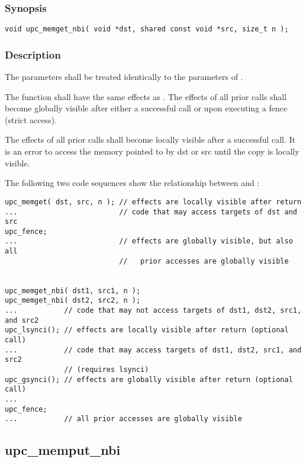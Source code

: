 \subsubsection{Synopsis}

\begin{verbatim}
void upc_memget_nbi( void *dst, shared const void *src, size_t n );
\end{verbatim}

\subsubsection{Description}

\npf The parameters shall be treated identically to the parameters of
\memget{}.

\np The \function{} function shall have the same effects as \memget{}.
The effects of all prior \function{} calls shall become globally visible after 
either a successful \gsynci{} call or upon executing a fence (strict access).

\np The effects of all prior \function{} calls shall become locally 
visible after a successful \lsynci{} call.  It is an error to access the memory
pointed to by dst or src until the copy is locally visible.

\np The following two code sequences show the relationship between
\memget{} and \function{}:

\begin{verbatim}
upc_memget( dst, src, n ); // effects are locally visible after return
...                        // code that may access targets of dst and src
upc_fence;                 
...                        // effects are globally visible, but also all
                           //   prior accesses are globally visible


upc_memget_nbi( dst1, src1, n );
upc_memget_nbi( dst2, src2, n );
...           // code that may not access targets of dst1, dst2, src1, and src2
upc_lsynci(); // effects are locally visible after return (optional call)
...           // code that may access targets of dst1, dst2, src1, and src2
              // (requires lsynci)
upc_gsynci(); // effects are globally visible after return (optional call)
...
upc_fence;
...           // all prior accesses are globally visible
\end{verbatim}

\newpage
\subsection{upc\_memput\_nbi}
\def\function{{\tt upc\_memput\_nbi}}

